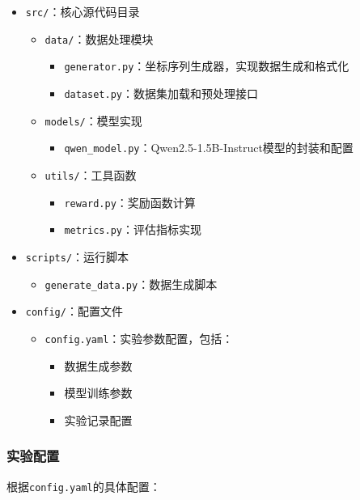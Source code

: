 \documentclass[a4paper, 12pt]{article}
\begin{document}
\begin{itemize}
    \item \texttt{src/}：核心源代码目录
        \begin{itemize}
            \item \texttt{data/}：数据处理模块
                \begin{itemize}
                    \item \texttt{generator.py}：坐标序列生成器，实现数据生成和格式化
                    \item \texttt{dataset.py}：数据集加载和预处理接口
                \end{itemize}
            \item \texttt{models/}：模型实现
                \begin{itemize}
                    \item \texttt{qwen\_model.py}：Qwen2.5-1.5B-Instruct模型的封装和配置
                \end{itemize}
            \item \texttt{utils/}：工具函数
                \begin{itemize}
                    \item \texttt{reward.py}：奖励函数计算
                    \item \texttt{metrics.py}：评估指标实现
                \end{itemize}
        \end{itemize}
    \item \texttt{scripts/}：运行脚本
        \begin{itemize}
            \item \texttt{generate\_data.py}：数据生成脚本
        \end{itemize}
    \item \texttt{config/}：配置文件
        \begin{itemize}
            \item \texttt{config.yaml}：实验参数配置，包括：
                \begin{itemize}
                    \item 数据生成参数
                    \item 模型训练参数
                    \item 实验记录配置
                \end{itemize}
        \end{itemize}
\end{itemize}

\subsubsection{实验配置}
根据\texttt{config.yaml}的具体配置：
\end{document}
